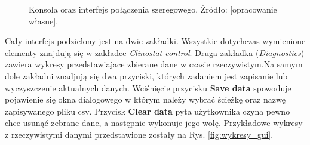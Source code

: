\begin{figure}[h]
	
	\centering
	\setlength{\fboxsep}{0pt}
	\setlength{\fboxrule}{1pt}
	\caption{Konsola oraz interfejs połączenia szeregowego. Źródło: [opracowanie własne].} 
	\label{fig:konsola_gui}
	
\end{figure}

Cały interfejs podzielony jest na dwie zakładki. Wszystkie dotychczas wymienione elementy znajdują się w zakładce \textit{Clinostat control}. Druga zakładka (\textit{Diagnostics}) zawiera wykresy przedstawiajace zbierane dane w czasie rzeczywistym.\linebreak Na samym dole zakładni znadjują się dwa przyciski, których zadaniem jest zapisanie lub wyczyszczenie aktualnych danych. Wciśnięcie przycisku \textbf{Save data} spowoduje pojawienie się okna dialogowego w którym należy wybrać ścieżkę oraz nazwę zapisywanego pliku csv. Przycisk \textbf{Clear data} pyta użytkownika czy\linebreak na pewno chce usunąć zebrane dane, a następnie wykonuje jego wolę. Przykładowe wykresy z rzeczywistymi danymi przedstawione zostały na Rys. \ref{fig:wykresy_gui}.

